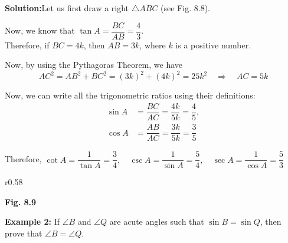 \documentclass[12pt]{article}
\begin{document}
\vspace{0.5em}
\noindent
\textbf{\textcolor{headerblue}{Solution:}}\noindent Let us first draw a right $\triangle ABC$ (see Fig. 8.8).

\vspace{0.5em}
\noindent
Now, we know that $\tan A = \dfrac{BC}{AB} = \dfrac{4}{3}$. \\
Therefore, if $BC = 4k$, then $AB = 3k$, where $k$ is a positive number.

\vspace{0.5em}
\noindent
Now, by using the Pythagoras Theorem, we have
\[
AC^2 = AB^2 + BC^2 = (3k)^2 + (4k)^2 = 25k^2
\quad \Rightarrow \quad
AC = 5k
\]

\vspace{0.5em}
\noindent
Now, we can write all the trigonometric ratios using their definitions:
\begin{align*}
\sin A &= \dfrac{BC}{AC} = \dfrac{4k}{5k} = \dfrac{4}{5}, \\
\cos A &= \dfrac{AB}{AC} = \dfrac{3k}{5k} = \dfrac{3}{5}
\end{align*}

\vspace{-0.5em}
\noindent
Therefore, \quad
$\cot A = \dfrac{1}{\tan A} = \dfrac{3}{4}, \quad 
\csc A = \dfrac{1}{\sin A} = \dfrac{5}{4}, \quad 
\sec A = \dfrac{1}{\cos A} = \dfrac{5}{3}$

\vspace{1em}

\begin{wrapfigure}{r}{0.58\textwidth}
\vspace{-2em}
\centering
{}

\textcolor{headerblue}{\textbf{Fig. 8.9}}
\end{wrapfigure}

\vspace{1em}
\noindent
\textbf{\textcolor{headerblue}{Example 2:}} If $\angle B$ and $\angle Q$ are acute angles such that $\sin B = \sin Q$, then prove that $\angle B = \angle Q$.
\end{document}
